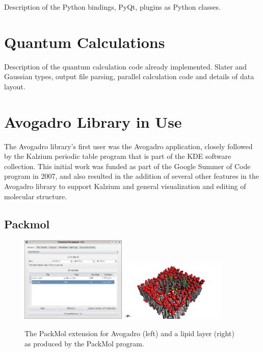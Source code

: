 \documentclass[10pt]{bmc_article}
\newenvironment{bmcformat}{\begin{raggedright}
\baselineskip20pt\sloppy\setboolean{publ}{false}}{\end{raggedright}
\baselineskip20pt\sloppy}
\begin{document}
\begin{bmcformat}
Description of the Python bindings, PyQt, plugins as Python classes.

\section{Quantum Calculations}

Description of the quantum calculation code already implemented. Slater and
Gaussian types, output file parsing, parallel calculation code and details of
data layout.

\section{Avogadro Library in Use}

The Avogadro library's first user was the Avogadro application, closely
followed by the Kalzium periodic table program that is part of the KDE software
collection. This initial work was funded as part of the Google Summer of Code
program in 2007, and also resulted in the addition of several other features in
the Avogadro library to support Kalzium and general visualization and editing
of molecular structure.

\subsection{Packmol}

\begin{figure}
  \includegraphics[width=0.45\textwidth]{images/packmol-extension}
  \includegraphics[width=0.45\textwidth]{images/packmol-lipid}
  \caption{The PackMol extension for Avogadro (left) and a lipid layer (right)
    as produced by the PackMol program.}
  \label{f:packmol}
\end{figure}


\end{bmcformat}
\end{document}
